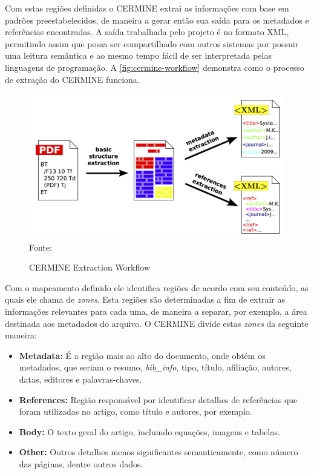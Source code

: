 Com estas regiões definidas o CERMINE extrai as informações com base em padrões preestabelecidos, de maneira a gerar então sua saída para os metadados e referências encontradas. A saída trabalhada pelo projeto é no formato XML, permitindo assim que possa ser compartilhado com outros sistemas por possuir uma leitura semântica e ao mesmo tempo fácil de ser interpretada pelas linguagens de programação. A \autoref{fig:cermine-workflow} demonstra como o processo de extração do CERMINE funciona.

\begin{figure}
    \centering
    \caption{CERMINE Extraction Workflow}
    \label{fig:cermine-workflow}
    \includegraphics[width=0.7\linewidth]{./assets/images/cermine}
    \center\footnotesize{Fonte: \cite{cermine}}
\end{figure}

Com o mapeamento definido ele identifica regiões de acordo com seu conteúdo, as quais ele chama de \textit{zones}. Esta regiões são determinadas a fim de extrair as informações relevantes para cada uma, de maneira a separar, por exemplo, a área destinada aos metadados do arquivo. O CERMINE divide estas \textit{zones} da seguinte maneira:

\begin{itemize}
    \item \textbf{Metadata:} É a região mais ao alto do documento, onde obtém os metadados, que seriam o resumo, \textit{bib\_info}, tipo, título, afiliação, autores, datas, editores e palavras-chaves.
    \item \textbf{References:} Região responsável por identificar detalhes de referências que foram utilizadas no artigo, como título e autores, por exemplo.
    \item \textbf{Body:} O texto geral do artigo, incluindo equações, imagens e tabelas.
    \item \textbf{Other:} Outros detalhes menos significantes semanticamente, como número das páginas, dentre outros dados.
\end{itemize}

